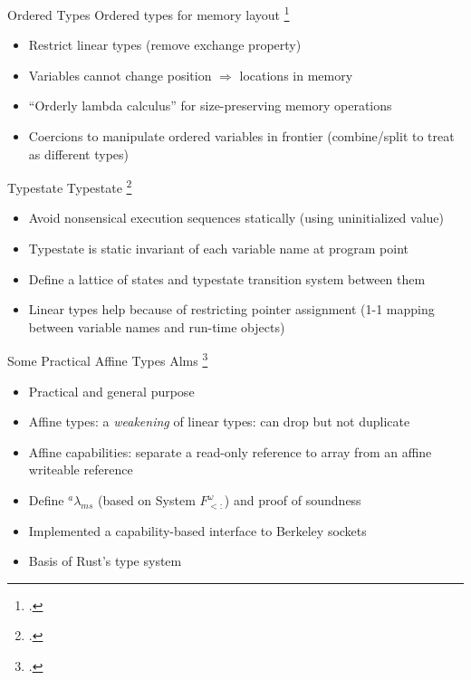 \begin{frame}{Ordered Types}
  Ordered types for memory layout \footcite{petersen_type_2003}
    \vspace{-0.09in}
    \begin{itemize}
        \item Restrict linear types (remove exchange property)
        \item Variables cannot change position $\Rightarrow$ locations in memory
        \item ``Orderly lambda calculus'' for size-preserving memory operations
        \item Coercions to manipulate ordered variables in frontier (combine/split to treat as different types)
    \end{itemize}
\end{frame}

\begin{frame}{Typestate}
  Typestate \footcite{strom_typestate:_1986}
    \begin{itemize}
        \item Avoid nonsensical execution sequences statically (using uninitialized value)
        \item Typestate is static invariant of each variable name at program point %
        \item Define a lattice of states and typestate transition system between them
        \item Linear types help because of restricting pointer assignment (1-1 mapping between variable names and run-time objects)
    \end{itemize}
\end{frame}

\begin{frame}{Some Practical Affine Types}
  Alms \footcite{tov_practical_2011}
    \begin{itemize}
        \item Practical and general purpose
        \item Affine types: a \emph{weakening} of linear types: can drop but not duplicate
        \item Affine capabilities: separate a read-only reference to array from an affine writeable reference
        \item Define $^{a}\lambda_{ms}$ (based on System $F^{\omega}_{<:}$) and proof of soundness 
        \item Implemented a capability-based interface to Berkeley sockets
        \item Basis of Rust's type system
    \end{itemize}
\end{frame}

